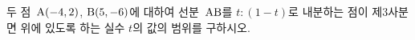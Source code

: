 두 점~$\mathrm{A}(-4{,}\mkern3mu\mathopen{}2)$, $\mathrm{B}(5{,}\mkern3mu\mathopen{}-6)$에 대하여 선분~$\mathrm{AB}$를 $t:(1-t)$로 내분하는 점이 제$3$사분면 위에 있도록 하는 실수 $t$의 값의 범위를 구하시오.
